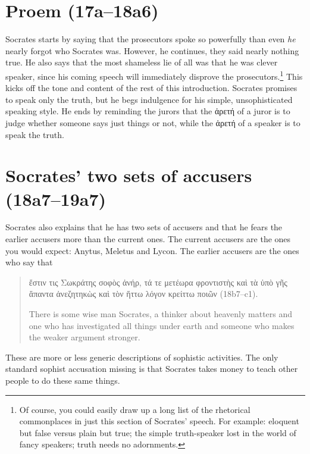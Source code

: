 \documentclass[11pt]{article}
\begin{document}

\section{Proem (17a--18a6)}

Socrates starts by saying that the prosecutors spoke so powerfully than
even \emph{he} nearly forgot who Socrates was.  However, he continues, they
said nearly nothing true.   He also says that the most shameless lie of all
was that he was clever speaker, since his coming speech will immediately
disprove the prosecutors.\footnote{Of course, you could easily draw up
a long list of the rhetorical commonplaces in just this section of Socrates'
speech.  For example: eloquent but false versus plain but true; the simple
truth-speaker lost in the world of fancy speakers; truth needs no
adornments.}  This kicks off the tone and content of the rest of this
introduction.  Socrates promises to speak only the truth, but he begs
indulgence for his simple, unsophisticated speaking style.  He ends by
reminding the jurors that the ἀρετή of a juror is to judge whether someone
says just things or not, while the ἀρετή of a speaker is to speak the
truth.

\section{Socrates' two sets of accusers (18a7--19a7)}

Socrates also explains that he has two sets of accusers and that he fears
the earlier accusers more than the current ones.  The current accusers are
the ones you would expect: Anytus, Meletus and Lycon.  The earlier accusers
are the ones who say that

\begin{quote}
    ἔστιν τις Σωκράτης σοφὸς ἀνήρ, τά τε μετέωρα φροντιστὴς καὶ τὰ ὑπὸ γῆς
    ἅπαντα ἀνεζητηκὼς καὶ τὸν ἥττω λόγον κρείττω ποιῶν (18b7--c1).

    There is some wise man Socrates, a thinker about heavenly matters and
    one who has investigated all things under earth and someone who makes
    the weaker argument stronger.
\end{quote}

These are more or less generic descriptions of sophistic activities.  The
only standard sophist accusation missing is that Socrates takes money to
teach other people to do these same things.
\end{document}
